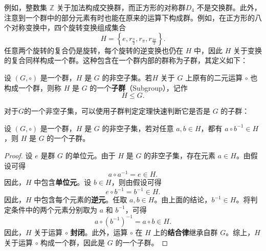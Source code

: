 例如，整数集 \(\mathbb Z\) 关于加法构成交换群，而正方形的对称群\(D_4\) 不是交换群。此外，注意到一个群中的部分元素有时也能在原来的运算下构成群。例如，在正方形的八个对称变换中，四个旋转变换组成集合
\[
    H=\left\{e,r_{\frac{\pi}{2}},r_\pi,r_{\frac{3\pi}{2}}\right\}.
\]
任意两个旋转的复合仍是旋转，每个旋转的逆变换也仍在 \(H\) 中，因此 \(H\) 关于变换的复合同样构成一个群。这种包含在一个群内部的群称为子群，其定义如下：
\begin{definition}[子群]
    \label{def_subgroup}
    设 \((G,\circ)\) 是一个群，\(H\) 是 \(G\) 的非空子集。若\(H\) 关于 \(G\) 上原有的二元运算 \(\circ\) 也构成一个群，则称 \(H\) 是 \(G\) 的一个\textbf{子群}（Subgroup），记作
    \[
        H\leq G.
    \]
\end{definition}
对于\( G \)的一个非空子集，可以使用子群判定定理快速判断它是否是 \( G \) 的子群：
\begin{theorem}[子群判定定理]
    \label{thm_subgroup_criterion}
    设 \((G,\circ)\) 是一个群，\(H\) 是 \(G\) 的非空子集，若对任意 \(a,b\in H\)，都有 \(a\circ b^{-1}\in H\)，则 \(H\) 是 \(G\) 的一个子群。
\end{theorem}
\begin{proof}
    设 \(e\) 是群 \(G\) 的单位元。由于 \(H\) 是 \(G\) 的非空子集，存在元素 \(a\in H\)。由假设可得
    \[
        a\circ a^{-1}=e\in H.
    \]
    因此，\(H\) 中包含\textbf{单位元}。设 \(b\in H\)，则由假设可得
    \[
        e\circ b^{-1}=b^{-1}\in H.
    \]
    因此，\(H\) 中包含每个元素的\textbf{逆元}。任取 \(a,b\in H\)。由上面的结论，\(b^{-1}\in H\)。将判定条件中的两个元素分别取为 \(a\) 和 \(b^{-1}\)，可得
    \[
        a\circ (b^{-1})^{-1}=a\circ b\in H.
    \]
    因此，\(H\) 关于运算 \(\circ\) \textbf{封闭}。此外，运算 \(\circ\) 在 \(H\) 上的\textbf{结合律}继承自群 \(G\)。综上，\(H\) 关于运算 \(\circ\) 构成一个群，因此是 \(G\) 的一个子群。
\end{proof}

